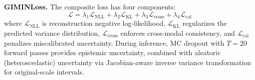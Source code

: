\textbf{GIMINLoss.} The composite loss has four components:
\begin{equation}
\mathcal{L} = \lambda_1 \mathcal{L}_{\text{NLL}} + \lambda_2 \mathcal{L}_{\text{KL}} + \lambda_3 \mathcal{L}_{\text{cross}} + \lambda_4 \mathcal{L}_{\text{cal}}
\label{p2:eq:loss}
\end{equation}
where $\mathcal{L}_{\text{NLL}}$ is reconstruction negative log-likelihood, $\mathcal{L}_{\text{KL}}$ regularizes the predicted variance distribution, $\mathcal{L}_{\text{cross}}$ enforces cross-modal consistency, and $\mathcal{L}_{\text{cal}}$ penalizes miscalibrated uncertainty. During inference, MC dropout with $T = 20$ forward passes provides epistemic uncertainty, combined with aleatoric (heteroscedastic) uncertainty via Jacobian-aware inverse variance transformation for original-scale intervals.

